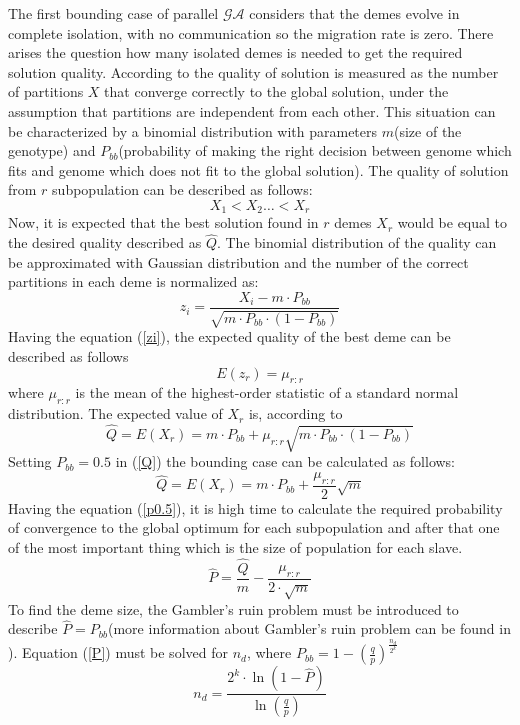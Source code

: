 The first bounding case of parallel $\mathcal{GA}$ considers that the demes
evolve in complete isolation, with no communication so the migration rate is
zero. There arises the question how many isolated demes is needed to get the
required solution quality. According to \cite{bib21} the quality of solution is
measured as the number of partitions $X$ that converge correctly to the global
solution, under the assumption that partitions are independent from each other.
This situation can be characterized by a binomial distribution with parameters $m$(size of the
genotype) and $P_{bb}$(probability of making the right decision between genome 
which fits and genome which does not fit to the global solution). The quality of
solution from $r$ subpopulation can be described as follows:
\begin{equation}
	X_1 < X_2 \ldots < X_r
	\label{statystyka}
\end{equation}
Now, it is expected that the best solution found in $r$ demes $X_r$ would be
equal to the desired quality described as $\hat{Q}$. The binomial distribution
of the quality can be approximated with Gaussian distribution and the number of
the correct partitions in each deme is normalized as:
\begin{equation}
	z_i=\frac{X_i-m\cdot P_{bb}}{\sqrt{m\cdot P_{bb}\cdot(1-P_{bb})}}
	\label{zi}
\end{equation}
Having the equation (\ref{zi}), the expected quality of the best deme can be
described as follows
\begin{equation}
	E(z_r)=\mu_{r:r}
	\label{Ez}
\end{equation}
where $\mu_{r:r}$ is the mean of the highest-order statistic of a standard normal
distribution. The expected value of $X_r$ is, according to \cite{bib21}
\begin{equation}
	\hat{Q}=E(X_r)=m\cdot P_{bb}+\mu_{r:r}\sqrt{m\cdot P_{bb}\cdot(1-P_{bb})}
	\label{Q}
\end{equation}
Setting $P_{bb}=0.5$ in (\ref{Q}) the bounding case can be calculated as
follows:
\begin{equation}
	\hat{Q}=E(X_r)=m\cdot P_{bb}+\frac{\mu_{r:r}}{2}\sqrt{m}	
	\label{p0.5}
\end{equation}
Having the equation (\ref{p0.5}), it is high time to calculate the required probability
of convergence to the global optimum for each subpopulation and after that one of
the most important thing which is the size of population for each slave. 
\begin{equation}
	\hat{P}=\frac{\hat{Q}}{m}-\frac{\mu_{r:r}}{2\cdot\sqrt{m}}
	\label{P}
\end{equation}
To find the deme size, the Gambler's ruin problem must be introduced to describe
$\hat{P}=P_{bb}$(more information about Gambler's ruin problem can be found in
\cite{bib26}). Equation (\ref{P}) must be solved for $n_d$, where
$P_{bb}=1-(\frac{q}{p})^{\frac{n_d}{2^k}}$
\begin{equation}
n_d=\frac{2^k\cdot\ln(1-\hat{P})}{\ln(\frac{q}{p})}
	\label{nd}
\end{equation}

